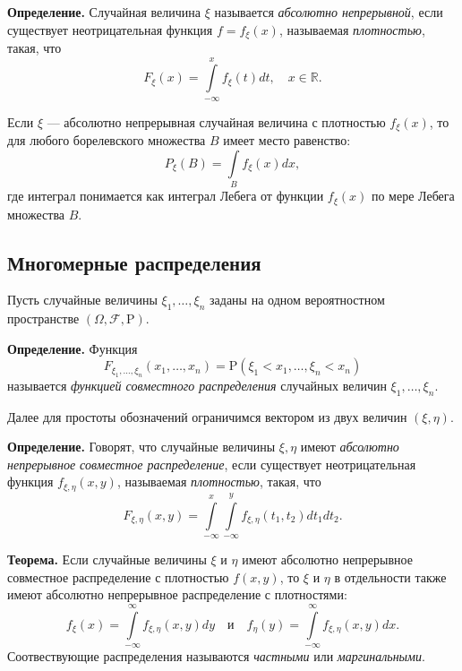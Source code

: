 \documentclass[11pt,a4paper]{article}
\begin{document}
\textbf{Определение.} Случайная величина \(\xi\) называется
\emph{абсолютно непрерывной}, если существует неотрицательная функция
\(f=f_\xi(x)\), называемая \emph{плотностью}, такая, что
\[ F_\xi(x) = \int\limits_{-\infty}^x f_\xi(t) dt, \quad x \in \mathbb{R}. \]

Если \(\xi\) --- абсолютно непрерывная случайная величина с плотностью
\(f_\xi(x)\), то для любого борелевского множества \(B\) имеет место
равенство: \[ P_\xi(B) = \int\limits_B f_\xi(x)dx, \] где интеграл
понимается как интеграл Лебега от функции \(f_\xi(x)\) по мере Лебега
множества \(B\).

    \hypertarget{ux43cux43dux43eux433ux43eux43cux435ux440ux43dux44bux435-ux440ux430ux441ux43fux440ux435ux434ux435ux43bux435ux43dux438ux44f}{%
\subsection{Многомерные
распределения}\label{ux43cux43dux43eux433ux43eux43cux435ux440ux43dux44bux435-ux440ux430ux441ux43fux440ux435ux434ux435ux43bux435ux43dux438ux44f}}

Пусть случайные величины \(\xi_1, \ldots, \xi_n\) заданы на одном
вероятностном пространстве \((\Omega, \mathcal{F}, \mathrm{P})\).

\textbf{Определение.} Функция
\[ F_{\xi_1, \ldots, \xi_n}(x_1, \ldots, x_n) = \mathrm{P}(\xi_1<x_1, \ldots, \xi_n<x_n) \]
называется \emph{функцией совместного распределения} случайных величин
\(\xi_1, \ldots , \xi_n\).

Далее для простоты обозначений ограничимся вектором из двух величин
\((\xi, \eta)\).

\textbf{Определение.} Говорят, что случайные величины \(\xi, \eta\)
имеют \emph{абсолютно непрерывное совместное распределение}, если
существует неотрицательная функция \(f_{\xi, \eta}(x, y)\), называемая
\emph{плотностью}, такая, что
\[ F_{\xi, \eta}(x, y) = \int\limits_{-\infty}^{x} \int\limits_{-\infty}^{y} f_{\xi, \eta}(t_1, t_2) dt_1 dt_2. \]

\textbf{Теорема.} Если случайные величины \(\xi\) и \(\eta\) имеют
абсолютно непрерывное совместное распределение с плотностью \(f(x, y)\),
то \(\xi\) и \(\eta\) в отдельности также имеют абсолютно непрерывное
распределение с плотностями:
\[ f_{\xi}(x) = \int\limits_{-\infty}^{\infty} f_{\xi, \eta}(x, y)dy \quad \mathrm{и} \quad f_{\eta}(y) = \int\limits_{-\infty}^{\infty} f_{\xi, \eta}(x, y)dx. \]
Соотвествующие распределения называются \emph{частными} или
\emph{маргинальными}.
\end{document}
